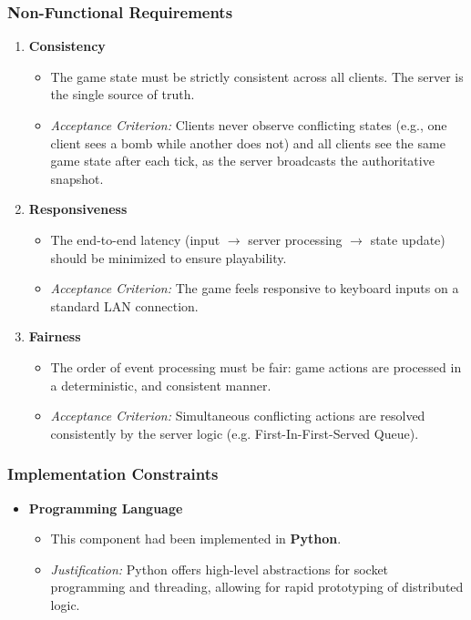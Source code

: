 \subsubsection{Non-Functional Requirements}
\begin{enumerate}
    \item \textbf{Consistency}
    \begin{itemize}
        \item The game state must be strictly consistent across all clients. The server is the single source of truth.
        \item \textit{Acceptance Criterion:} Clients never observe conflicting states (e.g., one client sees a bomb while another does not) and all clients see the same game state after each tick, as the server broadcasts the authoritative snapshot.
    \end{itemize}

    \item \textbf{Responsiveness}
    \begin{itemize}
        \item The end-to-end latency (input $\rightarrow$ server processing $\rightarrow$ state update) should be minimized to ensure playability.
        \item \textit{Acceptance Criterion:} The game feels responsive to keyboard inputs on a standard LAN connection.
    \end{itemize}

    \item \textbf{Fairness}
    \begin{itemize}
        \item The order of event processing must be fair: game actions are processed in a deterministic, and consistent manner.
        \item \textit{Acceptance Criterion:} Simultaneous conflicting actions are resolved consistently by the server logic (e.g. First-In-First-Served Queue).
    \end{itemize}
\end{enumerate}

\subsubsection{Implementation Constraints}
\begin{itemize}
    \item \textbf{Programming Language}
    \begin{itemize}
        \item This component had been implemented in \textbf{Python}.
        \item \textit{Justification:} Python offers high-level abstractions for socket programming and threading, allowing for rapid prototyping of distributed logic.
    \end{itemize}
\end{itemize}
